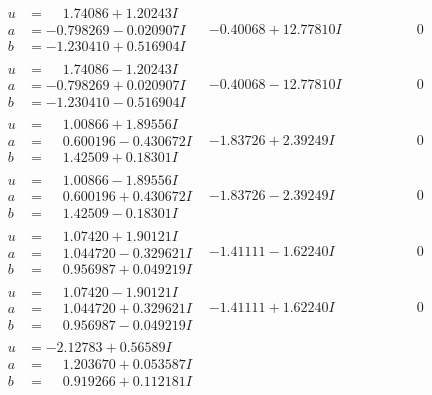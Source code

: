 \documentclass[1p]{elsarticle_modified}
\theoremstyle{definition}
\begin{document}
$$\begin{array}{c|c|c}
\begin{aligned}
u &= \phantom{-}1.74086 + 1.20243 I \\
a &= -0.798269 - 0.020907 I \\
b &= -1.230410 + 0.516904 I\end{aligned}
 & -0.40068 + 12.77810 I & \phantom{-0.000000 } 0 \\ \hline\begin{aligned}
u &= \phantom{-}1.74086 - 1.20243 I \\
a &= -0.798269 + 0.020907 I \\
b &= -1.230410 - 0.516904 I\end{aligned}
 & -0.40068 - 12.77810 I & \phantom{-0.000000 } 0 \\ \hline\begin{aligned}
u &= \phantom{-}1.00866 + 1.89556 I \\
a &= \phantom{-}0.600196 - 0.430672 I \\
b &= \phantom{-}1.42509 + 0.18301 I\end{aligned}
 & -1.83726 + 2.39249 I & \phantom{-0.000000 } 0 \\ \hline\begin{aligned}
u &= \phantom{-}1.00866 - 1.89556 I \\
a &= \phantom{-}0.600196 + 0.430672 I \\
b &= \phantom{-}1.42509 - 0.18301 I\end{aligned}
 & -1.83726 - 2.39249 I & \phantom{-0.000000 } 0 \\ \hline\begin{aligned}
u &= \phantom{-}1.07420 + 1.90121 I \\
a &= \phantom{-}1.044720 - 0.329621 I \\
b &= \phantom{-}0.956987 + 0.049219 I\end{aligned}
 & -1.41111 - 1.62240 I & \phantom{-0.000000 } 0 \\ \hline\begin{aligned}
u &= \phantom{-}1.07420 - 1.90121 I \\
a &= \phantom{-}1.044720 + 0.329621 I \\
b &= \phantom{-}0.956987 - 0.049219 I\end{aligned}
 & -1.41111 + 1.62240 I & \phantom{-0.000000 } 0 \\ \hline\begin{aligned}
u &= -2.12783 + 0.56589 I \\
a &= \phantom{-}1.203670 + 0.053587 I \\
b &= \phantom{-}0.919266 + 0.112181 I\end{aligned}

\end{array}$$
\end{document}
